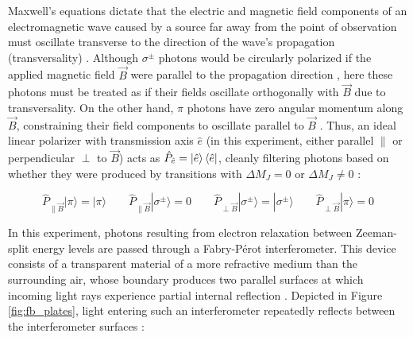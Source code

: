 \documentclass[11pt]{article}
\begin{document}

Maxwell's equations dictate that the electric and magnetic field components of an electromagnetic wave caused by a source far away from the point of observation must oscillate transverse to the direction of the wave's propagation (transversality) \cite{griff}. Although $\sigma^{\pm}$ photons would be circularly polarized if the applied magnetic field $\vec B$ were parallel to the propagation direction \cite{griff, qmech,griffiths_qm,hecht_optics}, here these photons must be treated as if their fields oscillate orthogonally with $\vec B$ due to transversality. On the other hand, $\pi$ photons have zero angular momentum along $\vec B$, constraining their field components to oscillate parallel to $\vec B$ \cite{griff,qmech,griffiths_qm,hecht_optics}. Thus, an ideal linear polarizer with transmission axis $\hat e$ (in this experiment, either parallel $\parallel$ or perpendicular $\perp$ to $\vec B$) acts as $\hat P_{\hat e} = \ket {\hat e} \bra {\hat e}$, cleanly filtering photons based on whether they were produced by transitions with $\Delta M_J = 0$ or $\Delta M_J \neq 0$ \cite{griffiths_qm, qmech}:

\begin{equation}
\hat P_{\parallel \vec B}|\pi\rangle = |\pi\rangle
\qquad
\hat P_{\parallel \vec B}|\sigma^\pm\rangle = 0
\qquad
\hat P_{\perp \vec B}|\sigma^\pm\rangle = |\sigma^\pm\rangle
\qquad
\hat P_{\perp \vec B}|\pi\rangle = 0
\label{eq:polarizer}
\end{equation}


In this experiment, photons resulting from electron relaxation between Zeeman-split energy levels are passed through a Fabry-P\'{e}rot interferometer. This device consists of a transparent material of a more refractive medium than the surrounding air, whose boundary produces two parallel surfaces at which incoming light
rays experience partial internal reflection \cite{mel,leybold}. Depicted in Figure \ref{fig:fb_plates}, light entering such an interferometer repeatedly reflects between the interferometer surfaces \cite{mel,leybold}:
\end{document}
